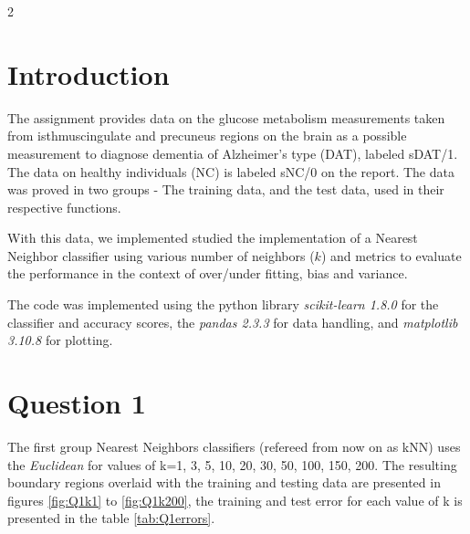 
\begin{paracol}{2}
  \section*{Introduction}

  The assignment provides data on the glucose metabolism measurements
  taken from isthmuscingulate and precuneus regions on the brain as a possible
  measurement to diagnose dementia of Alzheimer's type (DAT), labeled sDAT/1.
  The data on healthy individuals (NC) is labeled sNC/0 on the report.
  The data was proved in two groups - The training data, and the test data,
  used in their respective functions.

  With this data, we implemented studied the implementation of a Nearest Neighbor classifier
  using various number of neighbors ($k$) and metrics to evaluate the performance in the context of
  over/under fitting, bias and variance.

  The code was implemented using the python library \textit{scikit-learn 1.8.0}
  for the classifier and accuracy scores, the \textit{pandas 2.3.3} for data handling,
  and \textit{matplotlib 3.10.8} for plotting.


  \section*{Question 1}

  The first group Nearest Neighbors classifiers (refereed from now on as kNN) uses the \textit{Euclidean}
  for values of k=1, 3, 5, 10, 20, 30, 50, 100, 150, 200.
  The resulting boundary regions overlaid with
  the training and testing data are presented in figures \ref{fig:Q1k1} to \ref{fig:Q1k200}, the training
  and test error for each value of k is presented in the table \ref{tab:Q1errors}.
  

\end{paracol}
